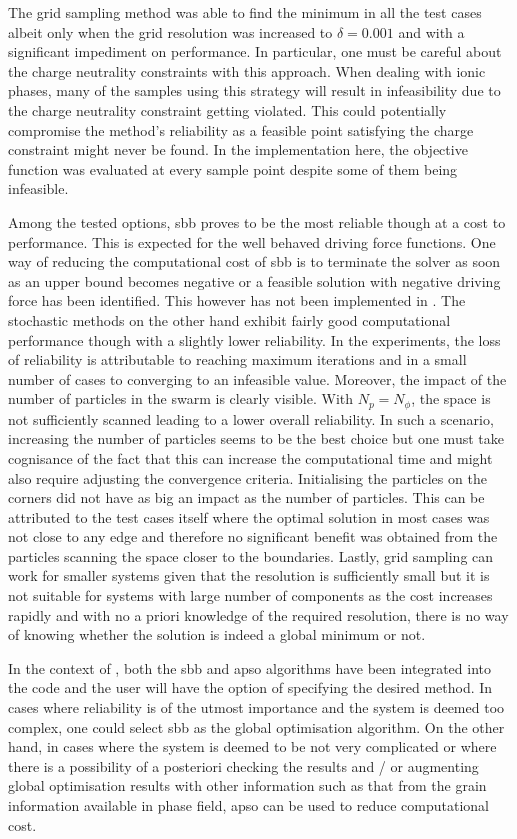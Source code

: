 The grid sampling method was able to find the minimum in all the test cases albeit only when the grid resolution was increased to $\delta = 0.001$ and with a significant impediment on performance. In particular, one must be careful about the charge neutrality constraints with this approach. When dealing with ionic phases, many of the samples using this strategy will result in infeasibility due to the charge neutrality constraint getting violated. This could potentially compromise the method's reliability as a feasible point satisfying the charge constraint might never be found. In the implementation here, the objective function was evaluated at every sample point despite some of them being infeasible.

Among the tested options, \gls{sbb} proves to be the most reliable though at a cost to performance. This is expected for the well behaved driving force functions. One way of reducing the computational cost of \gls{sbb} is to terminate the solver as soon as an upper bound becomes negative or a feasible solution with negative driving force has been identified. This however has not been implemented in {\GEM}. The stochastic methods on the other hand exhibit fairly good computational performance though with a slightly lower reliability. In the experiments, the loss of reliability is attributable to reaching maximum iterations and in a small number of cases to converging to an infeasible value. Moreover, the impact of the number of particles in the swarm is clearly visible. With $N_p = N_\phi$, the space is not sufficiently scanned leading to a lower overall reliability. In such a scenario, increasing the number of particles seems to be the best choice but one must take cognisance of the fact that this can increase the computational time and might also require adjusting the convergence criteria. Initialising the particles on the corners did not have as big an impact as the number of particles. This can be attributed to the test cases itself where the optimal solution in most cases was not close to any edge and therefore no significant benefit was obtained from the particles scanning the space closer to the boundaries. Lastly, grid sampling can work for smaller systems given that the resolution is sufficiently small but it is not suitable for systems with large number of components as the cost increases rapidly and with no a priori knowledge of the required resolution, there is no way of knowing whether the solution is indeed a global minimum or not.

In the context of {\YJ}, both the \gls{sbb} and \gls{apso} algorithms have been integrated into the code and the user will have the option of specifying the desired method. In cases where reliability is of the utmost importance and the system is deemed too complex, one could select \gls{sbb} as the global optimisation algorithm. On the other hand, in cases where the system is deemed to be not very complicated or where there is a possibility of a posteriori checking the results and / or augmenting global optimisation results with other information such as that from the grain information available in phase field, \gls{apso} can be used to reduce computational cost.

